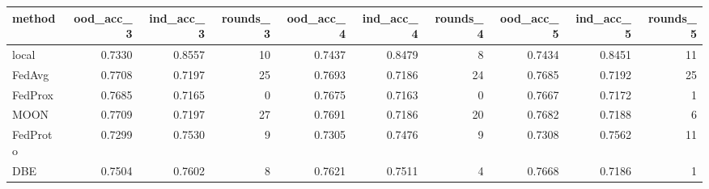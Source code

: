 \begin{tabular}{lrrrrrrrrr}
\toprule
method & ood_acc_3 & ind_acc_3 & rounds_3 & ood_acc_4 & ind_acc_4 & rounds_4 & ood_acc_5 & ind_acc_5 & rounds_5 \\
\midrule
local & 0.7330 & 0.8557 & 10 & 0.7437 & 0.8479 & 8 & 0.7434 & 0.8451 & 11 \\
FedAvg & 0.7708 & 0.7197 & 25 & 0.7693 & 0.7186 & 24 & 0.7685 & 0.7192 & 25 \\
FedProx & 0.7685 & 0.7165 & 0 & 0.7675 & 0.7163 & 0 & 0.7667 & 0.7172 & 1 \\
MOON & 0.7709 & 0.7197 & 27 & 0.7691 & 0.7186 & 20 & 0.7682 & 0.7188 & 6 \\
FedProto & 0.7299 & 0.7530 & 9 & 0.7305 & 0.7476 & 9 & 0.7308 & 0.7562 & 11 \\
DBE & 0.7504 & 0.7602 & 8 & 0.7621 & 0.7511 & 4 & 0.7668 & 0.7186 & 1 \\
\bottomrule
\end{tabular}
